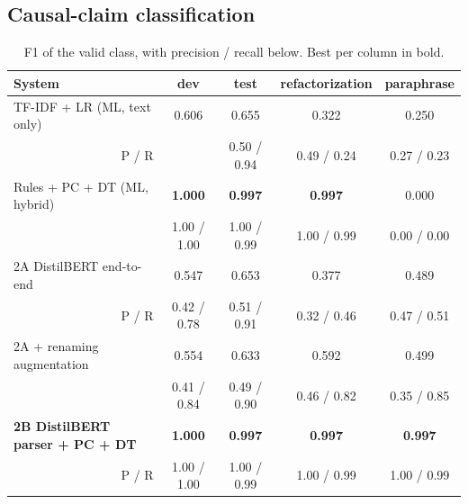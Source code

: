 \documentclass[12pt,a4paper]{article}
\newcommand{\thead}[1]{\textbf{#1}}
\begin{document}
\subsection{Causal-claim classification}

\begin{table}[!htbp]
\centering\small
\caption{F1 of the valid class, with precision / recall below. Best per column in bold.}
\label{tab:main}
\setlength{\tabcolsep}{4pt}
\begin{tabular}{@{}lcccc@{}}
\toprule
\thead{System} & \thead{dev} & \thead{test} & \thead{refactorization} & \thead{paraphrase} \\
\midrule
TF-IDF + LR (ML, text only) & 0.606 & 0.655 & 0.322 & 0.250 \\
\multicolumn{1}{r}{\scriptsize\color{slate}P / R} & & \scriptsize\color{slate}0.50 / 0.94 & \scriptsize\color{slate}0.49 / 0.24 & \scriptsize\color{slate}0.27 / 0.23 \\
\rowcolor{rowtint} Rules + PC + DT (ML, hybrid) & \textbf{1.000} & \textbf{0.997} & \textbf{0.997} & 0.000 \\
\rowcolor{rowtint} \multicolumn{1}{r}{\scriptsize\color{slate}P / R} & \scriptsize\color{slate}1.00 / 1.00 & \scriptsize\color{slate}1.00 / 0.99 & \scriptsize\color{slate}1.00 / 0.99 & \scriptsize\color{slate}0.00 / 0.00 \\
2A DistilBERT end-to-end & 0.547 & 0.653 & 0.377 & 0.489 \\
\multicolumn{1}{r}{\scriptsize\color{slate}P / R} & \scriptsize\color{slate}0.42 / 0.78 & \scriptsize\color{slate}0.51 / 0.91 & \scriptsize\color{slate}0.32 / 0.46 & \scriptsize\color{slate}0.47 / 0.51 \\
\rowcolor{rowtint} 2A + renaming augmentation & 0.554 & 0.633 & 0.592 & 0.499 \\
\rowcolor{rowtint} \multicolumn{1}{r}{\scriptsize\color{slate}P / R} & \scriptsize\color{slate}0.41 / 0.84 & \scriptsize\color{slate}0.49 / 0.90 & \scriptsize\color{slate}0.46 / 0.82 & \scriptsize\color{slate}0.35 / 0.85 \\
\textbf{2B DistilBERT parser + PC + DT} & \textbf{1.000} & \textbf{0.997} & \textbf{0.997} & \textbf{0.997} \\
\multicolumn{1}{r}{\scriptsize\color{slate}P / R} & \scriptsize\color{slate}1.00 / 1.00 & \scriptsize\color{slate}1.00 / 0.99 & \scriptsize\color{slate}1.00 / 0.99 & \scriptsize\color{slate}1.00 / 0.99 \\
\bottomrule
\end{tabular}
\end{table}
\end{document}
